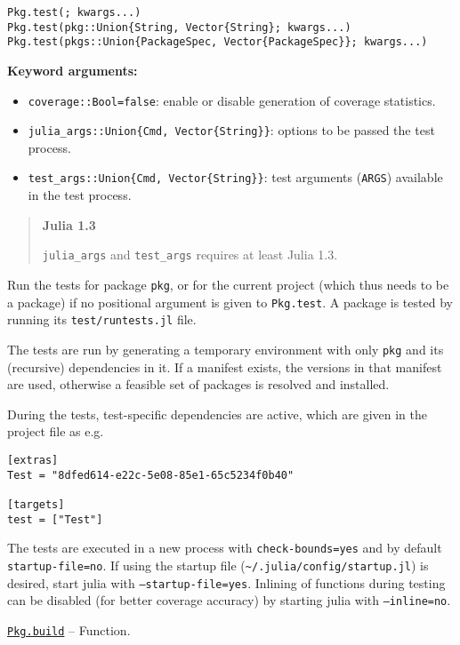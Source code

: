 \begin{adjustwidth}{2em}{0pt}


\begin{verbatim}
Pkg.test(; kwargs...)
Pkg.test(pkg::Union{String, Vector{String}; kwargs...)
Pkg.test(pkgs::Union{PackageSpec, Vector{PackageSpec}}; kwargs...)
\end{verbatim}

\textbf{Keyword arguments:}

\begin{itemize}
\item \texttt{coverage::Bool=false}: enable or disable generation of coverage statistics.


\item \texttt{julia\_args::Union\{Cmd, Vector\{String\}\}}: options to be passed the test process.


\item \texttt{test\_args::Union\{Cmd, Vector\{String\}\}}: test arguments (\texttt{ARGS}) available in the test process.

\end{itemize}
\begin{quote}
\textbf{Julia 1.3}

\texttt{julia\_args} and \texttt{test\_args} requires at least Julia 1.3.

\end{quote}
Run the tests for package \texttt{pkg}, or for the current project (which thus needs to be a package) if no positional argument is given to \texttt{Pkg.test}. A package is tested by running its \texttt{test/runtests.jl} file.

The tests are run by generating a temporary environment with only \texttt{pkg} and its (recursive) dependencies in it. If a manifest exists, the versions in that manifest are used, otherwise a feasible set of packages is resolved and installed.

During the tests, test-specific dependencies are active, which are given in the project file as e.g.


\begin{lstlisting}
[extras]
Test = "8dfed614-e22c-5e08-85e1-65c5234f0b40"

[targets]
test = ["Test"]
\end{lstlisting}

The tests are executed in a new process with \texttt{check-bounds=yes} and by default \texttt{startup-file=no}. If using the startup file (\texttt{{\textasciitilde}/.julia/config/startup.jl}) is desired, start julia with \texttt{--startup-file=yes}. Inlining of functions during testing can be disabled (for better coverage accuracy) by starting julia with \texttt{--inline=no}.



\end{adjustwidth}
\hypertarget{1343006981993025790}{} 
\hyperlink{1343006981993025790}{\texttt{Pkg.build}}  -- {Function.}

